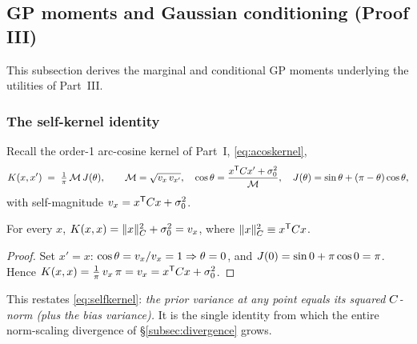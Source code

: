\subsection{GP moments and Gaussian conditioning (Proof III)}
\label{subsec:moments}

This subsection derives the marginal and conditional GP moments underlying the
utilities of Part~III.

\subsubsection{The self-kernel identity}
Recall the order-1 arc-cosine kernel of Part~I, \eqref{eq:acoskernel},
\[
  K(x,x') \;=\; \tfrac1\pi\,\mathcal{M}\,J(\theta),\qquad
  \mathcal{M}=\sqrt{v_{x}\,v_{x'}},\quad
  \cos\theta=\frac{x^{\mathsf{T}}C x'+\sigma_{0}^2}{\mathcal{M}},\quad
  J(\theta)=\sin\theta+(\pi-\theta)\cos\theta,
\]
with self-magnitude $v_{x}=x^{\mathsf{T}}C x+\sigma_{0}^2$.

\begin{lemma}\label{lem:selfkernel}
For every $x$, $K(x,x)=\lVert x\rVert_{C}^2+\sigma_{0}^2=v_{x}$, where
$\lVert x\rVert_{C}^2\equiv x^{\mathsf{T}}C x$.
\end{lemma}
\begin{proof}
Set $x'=x$: $\cos\theta=v_x/v_x=1\Rightarrow\theta=0$, and
$J(0)=\sin0+\pi\cos0=\pi$. Hence
$K(x,x)=\tfrac1\pi\,v_x\,\pi=v_x=x^{\mathsf{T}}C x+\sigma_{0}^2$.
\end{proof}

This restates \eqref{eq:selfkernel}: \emph{the prior variance at any point equals
its squared $C$-norm (plus the bias variance).} It is the single identity
from which the entire norm-scaling divergence of \S\ref{subsec:divergence} grows.

